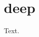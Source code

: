 
\section{{{{{{{{{{{{{{{{{{{{{{{{{{{{{{{{{{{{{{{{{{{{{{{{{{{{{{{{{{{{{{{{{{{{{{{{{{{{{{{{{{{{{{{{{{{{{{{{{{{{{{{{{{{{{{{{{{{{{{{{{{{{{{{{{{{{{{{{{{{{{{{{{{{{{{{{{{{{{{{{{{{{{{{{{{{{{{{{{{{{{{{{{{{{{{{{{{{{{{{{{{{{{{{{{{{{{{{{{{{{{{{{{{{{{{{{{{{{{{{{{{{{{{{{{{{{{{{{{{{{{{{{{{{{{{{{{{{{{{{{{{{{{{{{{{{{{{{{{{{{{deep}}}}}}}}}}}}}}}}}}}}}}}}}}}}}}}}}}}}}}}}}}}}}}}}}}}}}}}}}}}}}}}}}}}}}}}}}}}}}}}}}}}}}}}}}}}}}}}}}}}}}}}}}}}}}}}}}}}}}}}}}}}}}}}}}}}}}}}}}}}}}}}}}}}}}}}}}}}}}}}}}}}}}}}}}}}}}}}}}}}}}}}}}}}}}}}}}}}}}}}}}}}}}}}}}}}}}}}}}}}}}}}}}}}}}}}}}}}}}}}}}}}}}}}}}}}}}}}}}}}}}}}}}}}}}}}}}}}}}}}}}}}}}}}}}}}}}}}}}}}}}
Text.


